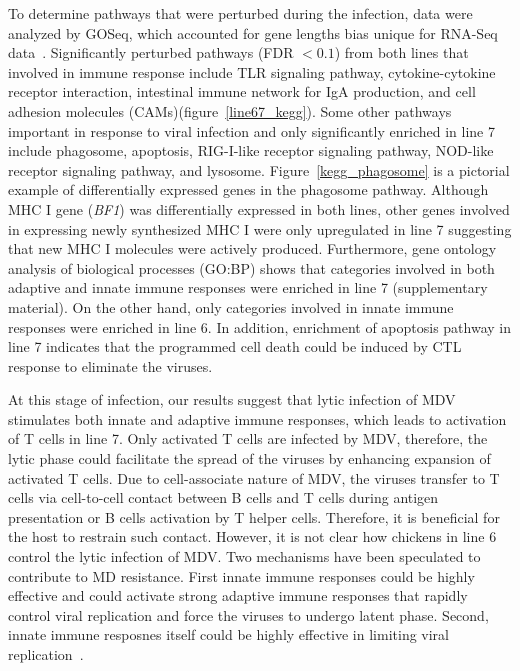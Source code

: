 \documentclass[10pt]{article}
\begin{document}
To determine pathways that were perturbed during the infection, data were
analyzed by GOSeq, which accounted for gene lengths bias unique for RNA-Seq
data~\cite{young2010method}.  Significantly perturbed pathways (FDR $< 0.1$)
from both lines that involved in immune response include TLR signaling pathway,
cytokine-cytokine receptor interaction, intestinal immune network for IgA
production, and cell adhesion molecules (CAMs)(figure~\ref{line67_kegg}).  Some
other pathways important in response to viral infection and only significantly
enriched in line 7 include phagosome, apoptosis, RIG-I-like receptor signaling
pathway, NOD-like receptor signaling pathway, and lysosome.
Figure~\ref{kegg_phagosome} is a pictorial example of differentially expressed
genes in the phagosome pathway.  Although MHC I gene ({\em BF1}) was
differentially expressed in both lines, other genes involved in expressing newly
synthesized MHC I were only upregulated in line 7 suggesting that new MHC I
molecules were actively produced.  Furthermore, gene ontology analysis of
biological processes (GO:BP) shows that categories involved in both adaptive and
innate immune responses were enriched in line 7 (supplementary material).  On
the other hand, only categories involved in innate immune responses were
enriched in line 6.  In addition, enrichment of apoptosis pathway in line 7
indicates that the programmed cell death could be induced by CTL response to
eliminate the viruses.

At this stage of infection, our results suggest that lytic infection of MDV
stimulates both innate and adaptive immune responses, which leads to activation
of T cells in line 7.  Only activated T cells are infected by MDV, therefore,
the lytic phase could facilitate the spread of the viruses by enhancing
expansion of activated T cells.  Due to cell-associate nature of MDV, the
viruses transfer to T cells via cell-to-cell contact between B cells and T cells
during antigen presentation or B cells activation by T helper cells.  Therefore,
it is beneficial for the host to restrain such contact.  However, it is not
clear how chickens in line 6 control the lytic infection of MDV.  Two mechanisms
have been speculated to contribute to MD resistance.  First innate immune
responses could be highly effective and could activate strong adaptive immune
responses that rapidly control viral replication and force the viruses to
undergo latent phase.  Second, innate immune resposnes itself could be highly
effective in limiting viral replication~\cite{smith2011systems}.
\end{document}
